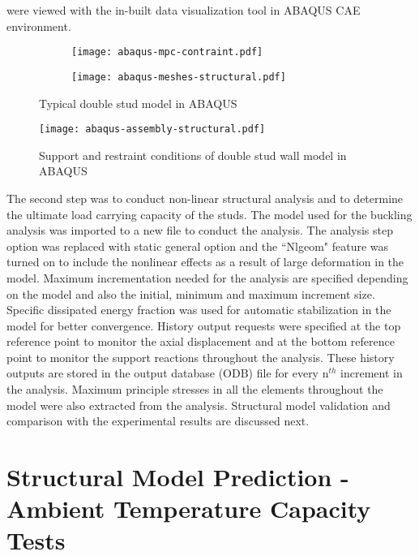 were viewed with the in-built data visualization tool in ABAQUS CAE environment.
\begin{figure}[!htbp]
	\centering
	\begin{subfigure}[b]{0.4\textwidth}
		\centering
		\texttt{[image: abaqus-mpc-contraint.pdf]}
		\caption{}
		\label{subfig:abaqus-mpc-contraint}
	\end{subfigure}
	\begin{subfigure}[b]{0.4\textwidth}
		\centering
		\texttt{[image: abaqus-meshes-structural.pdf]}
		\caption{}
		\label{subfig:abaqus-meshes-structural}
	\end{subfigure}
	   \caption{Typical double stud model in ABAQUS}
	   \label{fig:abaqus-typical-model}
\end{figure}
\begin{figure}[!htbp]
	\centering
			\texttt{[image: abaqus-assembly-structural.pdf]}\\
		\caption{Support and restraint conditions of double stud wall model in ABAQUS}
		\label{fig:abaqus-full-assembly}
\end{figure}

The second step was to conduct non-linear structural analysis and to determine the ultimate load carrying capacity of the studs. The model used for the buckling analysis was imported to a new file to conduct the analysis. The analysis step option was replaced with static general option and the ``Nlgeom" feature was turned on to include the nonlinear effects as a result of large deformation in the model. Maximum incrementation needed for the analysis are specified depending on the model and also the initial, minimum and maximum increment size. Specific dissipated energy fraction was used for automatic stabilization in the model for better convergence. History output requests were specified at the top reference point to monitor the axial displacement and at the bottom reference point to monitor the support reactions throughout the analysis. These history outputs are stored in the output database (ODB) file for every n\(^{th}\) increment in the analysis. Maximum principle stresses in all the elements throughout the model were also extracted from the analysis. Structural model validation and comparison with the experimental results are discussed next.

\section{Structural Model Prediction - Ambient Temperature Capacity Tests}

